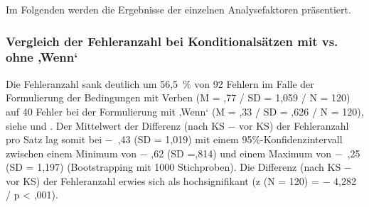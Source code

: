 Im Folgenden werden die Ergebnisse der einzelnen Analysefaktoren präsentiert.

\subsubsection{\label{sec:5.3.3.1}Vergleich der Fehleranzahl bei Konditionalsätzen mit vs. ohne ‚Wenn‘}

Die Fehleranzahl sank deutlich um 56,5~\% von 92 Fehlern im Falle der Formulierung der Bedingungen mit Verben (M = ,77 / SD = 1,059 / N = 120) auf 40 Fehler bei der Formulierung mit ‚Wenn‘ (M = ,33 / SD = ,626 / N = 120), siehe  und . Der Mittelwert der Differenz (nach KS $-$ vor KS) der Fehleranzahl pro Satz lag somit bei $-$~,43 (SD = 1,019) mit einem 95\%\nobreakdash-Konfidenzintervall zwischen einem Minimum von $-$ ,62 (SD =,814) und einem Maximum von $-$~,25 (SD = 1,197) (Bootstrapping mit 1000 Stichproben). Die Differenz (nach KS $-$ vor KS) der Fehleranzahl erwies sich als hochsignifikant (z (N = 120) = $-$ 4,282 / p < ,001).




\begin{figure}
\captionsetup{width=.45\textwidth}
\begin{floatrow}
\end{floatrow}
\end{figure}



